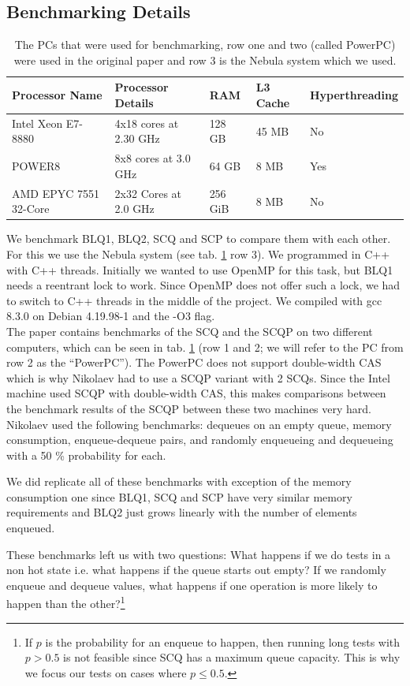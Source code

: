 \documentclass{article}      %
\begin{document}
\subsection{Benchmarking Details}
\begin{table}[]
	\begin{tabular}{|l|l|l|l|l|}
		\hline
		Processor Name         & Processor Details      & RAM    & L3 Cache & Hyperthreading \\ \hline
		Intel Xeon E7-8880     & 4x18 cores at 2.30 GHz & 128 GB & 45 MB    & No             \\
		POWER8                 & 8x8 cores at 3.0 GHz   & 64 GB  & 8 MB     & Yes            \\
		AMD EPYC 7551 32-Core & 2x32 Cores at 2.0 GHz  & 256 GiB & 8 MB     & No             \\ \hline
	\end{tabular}
	\label{tab:pcs}
	\caption{The PCs that were used for benchmarking, row one and two (called PowerPC) were used in the original paper and row 3 is the Nebula system which we used.}
\end{table}
 We benchmark BLQ1, BLQ2, SCQ and SCP to compare them with each other. For this we use the Nebula system (see tab. \ref{tab:pcs} row 3). We programmed in C++ with C++ threads. Initially we wanted to use OpenMP for this task, but BLQ1 needs a reentrant lock to work. Since OpenMP does not offer such a lock, we had to switch to C++ threads in the middle of the project. We compiled with gcc 8.3.0 on Debian 4.19.98-1 and the -O3 flag. \\
The paper contains benchmarks of the SCQ and the SCQP on two different computers, which can be seen in tab. \ref{tab:pcs} (row 1 and 2; we will refer to the PC from row 2 as the ``PowerPC'').
 The PowerPC does not support double-width CAS which is why Nikolaev had to use a SCQP variant with 2 SCQs. Since the Intel machine used SCQP with double-width CAS, this makes comparisons between the benchmark results of the SCQP between these two machines very hard. Nikolaev used the following benchmarks: dequeues on an empty queue, memory consumption, enqueue-dequeue pairs, and randomly enqueueing and dequeueing with a 50 \% probability for each.
 
We did replicate all of these benchmarks with exception of the memory consumption one since BLQ1, SCQ and SCP have very similar memory requirements and BLQ2 just grows linearly with the number of elements enqueued. 

These benchmarks left us with two questions: What happens if we do tests in a non hot state i.e. what happens if the queue starts out empty? If we randomly enqueue and dequeue values, what happens if one operation is more likely to happen than the other?\footnote{If $p$ is the probability for an enqueue to happen, then running long tests with $p > 0.5$ is not feasible since SCQ has a maximum queue capacity. This is why we focus our tests on cases where $p \leq 0.5$.} 
\end{document}
